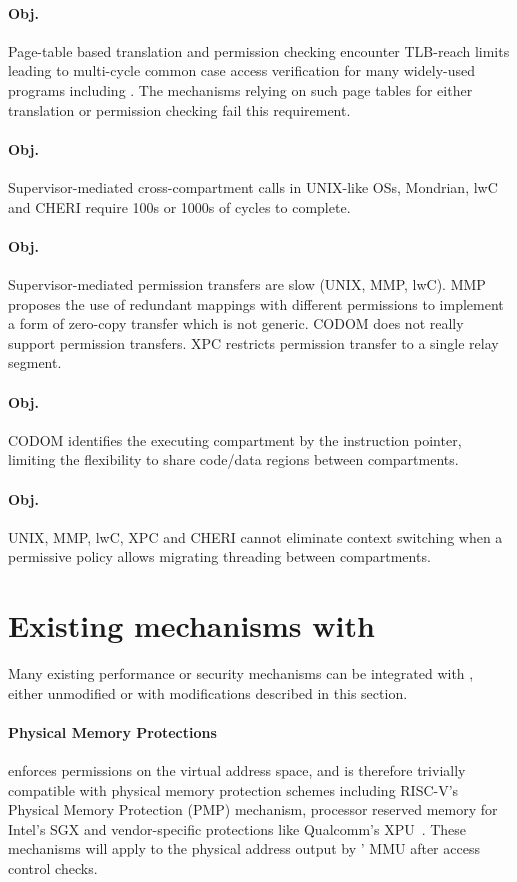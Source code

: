 \paragraph{Obj. }
Page-table based translation and permission checking encounter TLB-reach
limits leading to multi-cycle common case access verification for many
widely-used programs including . The mechanisms relying on
such page tables for either translation or permission checking fail this
requirement.

\paragraph{Obj. }
Supervisor-mediated cross-compartment calls in UNIX-like OSs,
Mondrian, lwC and CHERI require 100s or 1000s of cycles to complete.

\paragraph{Obj. }
Supervisor-mediated permission transfers are slow (UNIX, MMP, lwC).
MMP proposes the use of redundant mappings with different permissions
to implement a form of zero-copy transfer which is not generic.
CODOM does not really support permission transfers.
XPC restricts permission transfer to a single relay segment.

\paragraph{Obj. }
CODOM identifies the executing compartment by the instruction pointer, 
limiting the flexibility to share code/data regions between compartments.

\paragraph{Obj. }
UNIX, MMP, lwC, XPC and CHERI cannot eliminate context switching when a
permissive policy allows migrating threading between compartments.

\section{Existing mechanisms with \seccells}
\label{app:integrate_exist}
Many existing performance or security mechanisms can be integrated with
\seccells, either unmodified or with modifications described in this section.

\paragraph{Physical Memory Protections}
\seccells enforces permissions on the virtual address space, and is therefore
trivially compatible with physical memory protection schemes 
including RISC-V's Physical Memory Protection (PMP) mechanism, 
processor reserved memory for Intel's SGX
and vendor-specific protections like Qualcomm's XPU~\cite{qualcomm_ac}.
These mechanisms will apply to the physical address output by 
\seccells' MMU after \ptable access control checks.

